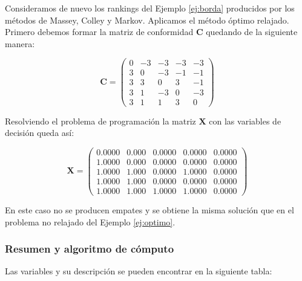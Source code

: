 \begin{ejemplo}
Consideramos de nuevo los rankings del Ejemplo \ref{ej:borda} producidos por los métodos de Massey, Colley y Markov. Aplicamos el método óptimo relajado. Primero debemos formar la matriz de conformidad $\mathbf{C}$ quedando de la siguiente manera:

\begin{equation*}
\mathbf{C} = \left(\begin{array}{rrrrr}
0 & -3 & -3 & -3 & -3 \\
3 &  0 & -3 & -1 & -1 \\
3 &  3 &  0 &  3 & -1 \\
3 &  1 & -3 &  0 & -3 \\
3 &  1 &  1	&  3 &	0
\end{array}\right)
\end{equation*}

Resolviendo el problema de programación la matriz $\mathbf{X}$ con las variables de decisión queda así:

\begin{equation*}
\mathbf{X} = \left(\begin{array}{rrrrr}
0.0000 & 0.000 & 0.0000 & 0.0000 & 0.0000 \\
1.0000 & 0.000 & 0.0000 & 0.0000 & 0.0000 \\
1.0000 & 1.000 & 0.0000 & 1.0000 & 0.0000 \\
1.0000 & 1.000 & 0.0000 & 0.0000 & 0.0000 \\
1.0000 & 1.000 & 1.0000 & 1.0000 & 0.0000
\end{array}\right)
\end{equation*}

En este caso no se producen empates y se obtiene la misma solución que en el problema no relajado del Ejemplo \ref{ej:optimo}.


\end{ejemplo}

\subsubsection*{Resumen y algoritmo de cómputo}

Las variables y su descripción se pueden encontrar en la siguiente tabla:

